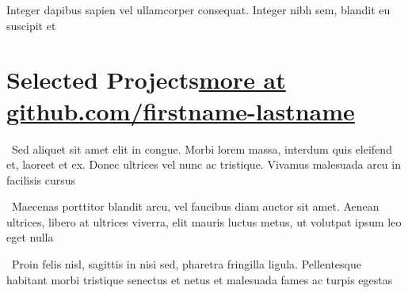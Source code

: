 \documentclass[letterpaper,12pt]{werner} %
\begin{document}
\begin{minipage}[t]{0.76\textwidth}


\end{minipage}
\hfill
\begin{minipage}[t]{0.22\textwidth}
\begin{flushright}

{}

\end{flushright}
\end{minipage}
\vspace{1pt} 
\begin{justify}
Integer dapibus sapien vel ullamcorper consequat. Integer nibh sem, blandit eu suscipit et
\end{justify}

\vspace{-2pt}
\sectionspace


\section{Selected Projects\hfill \small{\href{https://github.com/}{more at github.com/firstname-lastname}}}

\begin{minipage}[t]{\textwidth}

{} \lildot\, Sed aliquet sit amet elit in congue. Morbi lorem massa, interdum quis eleifend et, laoreet et ex. Donec ultrices vel nunc ac tristique. Vivamus malesuada arcu in facilisis cursus\vspace{8pt}

{} \lildot\, Maecenas porttitor blandit arcu, vel faucibus diam auctor sit amet. Aenean ultrices, libero at ultrices viverra, elit mauris luctus metus, ut volutpat ipsum leo eget nulla\vspace{8pt}

{} \lildot\, Proin felis nisl, sagittis in nisi sed, pharetra fringilla ligula. Pellentesque habitant morbi tristique senectus et netus et malesuada fames ac turpis egestas

\end{minipage}
\end{document}
